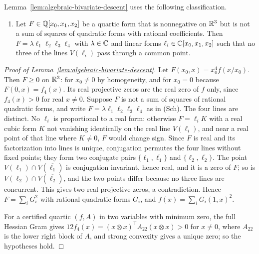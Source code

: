 Lemma~\ref{lem:algebraic-bivariate-descent} uses the following classification.

\begin{enumerate}[label=(Sch)]
\item \cite{Scheiderer2016} Let $F\in\mathbb Q[x_0,x_1,x_2]$ be a quartic form that is
  nonnegative on $\mathbb R^3$ but is not a sum of squares of quadratic forms with
  rational coefficients. Then $F=\lambda\ell_1\ell_2\ell_3\ell_4$ with
  $\lambda\in\mathbb C$ and linear forms $\ell_i\in\mathbb C[x_0,x_1,x_2]$ such that no three
  of the lines $V(\ell_i)$ pass through a common point.
\end{enumerate}

\begin{proof}[Proof of Lemma~\ref{lem:algebraic-bivariate-descent}]
Let $F(x_0,x)=x_0^4f(x/x_0)$. Then $F\ge0$ on $\mathbb R^3$: for $x_0\ne0$ by
homogeneity, and for $x_0=0$ because $F(0,x)=f_4(x)$. Its real projective
zeros are the real zero of $f$ only, since $f_4(x)>0$ for real $x\ne0$.
Suppose $F$ is not a sum of squares of rational quadratic forms, and write
$F=\lambda\ell_1\ell_2\ell_3\ell_4$ as in (Sch). The four lines are distinct.
No $\ell_i$ is proportional to a real form: otherwise $F=\ell_iK$ with a real
cubic form $K$ not vanishing identically on the real line $V(\ell_i)$, and
near a real point of that line where $K\ne0$, $F$ would change sign. Since
$F$ is real and its factorization into lines is unique, conjugation permutes
the four lines without fixed points; they form two conjugate pairs
$\{\ell_1,\overline{\ell_1}\}$ and $\{\ell_2,\overline{\ell_2}\}$. The point
$V(\ell_1)\cap V(\overline{\ell_1})$ is conjugation invariant, hence real, and
it is a zero of $F$; so is $V(\ell_2)\cap V(\overline{\ell_2})$, and the two
points differ because no three lines are concurrent. This gives two real
projective zeros, a contradiction. Hence $F=\sum_iG_i^2$ with rational
quadratic forms $G_i$, and $f(x)=\sum_iG_i(1,x)^2$.

For a certified quartic $(f,A)$ in two variables with minimum zero, the full
Hessian Gram gives $12f_4(x)=(x\otimes x)^{\mathsf T}A_{22}(x\otimes x)>0$ for
$x\ne0$, where $A_{22}$ is the lower right block of $A$, and strong convexity
gives a unique zero; so the hypotheses hold.
\end{proof}

